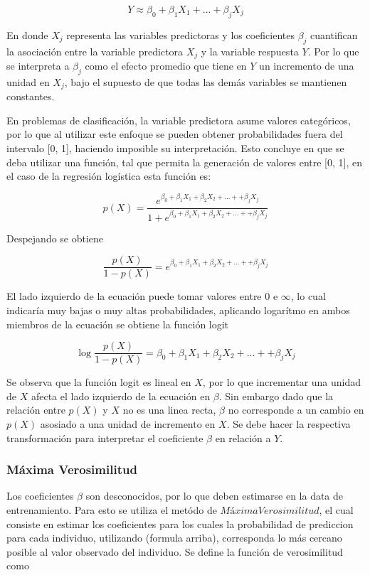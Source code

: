 \documentclass[a4paper,12pt]{Latex/Classes/PhDthesisPSnPDF}
\begin{document}
$$ Y \approx \beta_{0} + \beta_{1}X_{1} + ... + \beta_{j}X_{j} $$

En donde $X_{j}$ representa las variables predictoras y los coeficientes $\beta_{j}$ cuantifican la asociación entre la variable predictora $X_{j}$ y la variable respuesta $Y$. Por lo que se interpreta a $\beta_{j}$ como el efecto promedio que tiene en $Y$ un incremento de una unidad en $X_{j}$, bajo el supuesto de que todas las demás variables se mantienen constantes.

En problemas de clasificación, la variable predictora asume valores categóricos, por lo que al utilizar este enfoque se pueden obtener probabilidades fuera del intervalo [0, 1], haciendo imposible su interpretación. Esto concluye en que se deba utilizar una función, tal que permita la generación de valores entre [0, 1], en el caso de la regresión logística esta función es:

$$
p(X) = \frac{e^{\beta_{0} + \beta_{1}X_{1} + \beta_{2}X_{2} + ... + + \beta_{j}X_{j} }}{1 + e^{\beta_{0} + \beta_{1}X_{1} + \beta_{2}X_{2} + ... + + \beta_{j}X_{j} }}
$$

Despejando se obtiene

$$ \frac{p(X)}{1 - p(X)} = e^{\beta_{0} + \beta_{1}X_{1} + \beta_{2}X_{2} + ... + + \beta_{j}X_{j} } $$

El lado izquierdo de la ecuación puede tomar valores entre 0 e $\infty$, lo cual indicaría muy bajas o muy altas probabilidades, aplicando logarítmo en ambos miembros de la ecuación se obtiene la función logit

$$ \log{\frac{p(X)}{1 - p(X)}} = \beta_{0} + \beta_{1}X_{1} + \beta_{2}X_{2} + ... + + \beta_{j}X_{j}  $$

Se observa que la función logit es lineal en $X$, por lo que incrementar una unidad de $X$ afecta el lado izquierdo de la ecuación en $\beta$. Sin embargo dado que la relación entre $p(X)$ y $X$ no es una linea recta, $\beta$ no corresponde a un cambio en $p(X)$ asosiado a una unidad de incremento en $X$. Se debe hacer la respectiva transformación para interpretar el coeficiente $\beta$ en relación a $Y$.

\subsubsection{Máxima Verosimilitud}

Los coeficientes $\beta$ son desconocidos, por lo que deben estimarse en la data de entrenamiento. Para esto se utiliza el metódo de $Máxima Verosimilitud$, el cual consiste en estimar los coeficientes para los cuales la probabilidad de prediccion para cada individuo, utilizando (formula arriba), corresponda lo más cercano posible al valor observado del individuo. Se define la función de verosimilitud como
\end{document}
